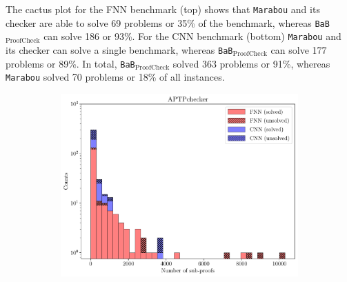 \documentclass[oneside,11pt,dvipsnames]{book}
\newcommand{\proofcheck}{\texttt{BaB$_{\text{ProofCheck}}$}}
\newcommand{\marabou}{\texttt{Marabou}}
\begin{document}
The cactus plot for the FNN benchmark (top)
shows that \marabou{} and its checker are able to solve 69 problems or 35\% of the benchmark, whereas \proofcheck{} can solve 186 or 93\%.  
For the CNN benchmark (bottom) \marabou{} and its checker can solve a single benchmark, whereas \proofcheck{} can solve 177 problems or 89\%.
In total, \proofcheck{} solved 363 problems or 91\%, whereas \marabou{}  solved 70 problems or 18\% of all instances.

\begin{figure}[t]
\begin{subfigure}{0.4\linewidth}
    \centering
    \begin{minipage}[t]{0.75\textwidth}
        \centering  
        \includegraphics[width=\linewidth]{figure/SUB_PROOFS_NONE.pdf}
    \end{minipage}
    \begin{minipage}[t]{0.235\textwidth}
        \centering  

\end{minipage}
\end{subfigure}
\end{figure}
\end{document}

